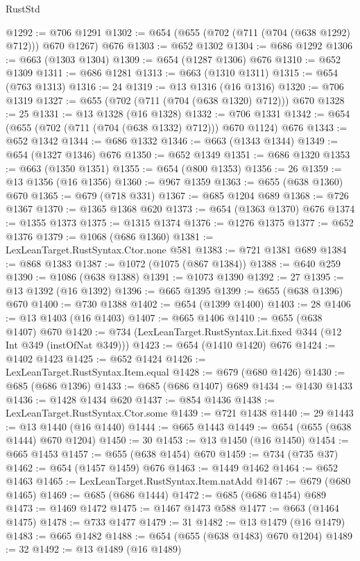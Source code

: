 \begin{lexlean}{RustStd}
\begin{coremodule}
@1292 := @706 @1291
@1302 := @654 (@655 (@702 (@711 (@704 (@638 @1292) @712))) @670 @1267) @676
@1303 := @652 @1302
@1304 := @686 @1292
@1306 := @663 (@1303 @1304)
@1309 := @654 (@1287 @1306) @676
@1310 := @652 @1309
@1311 := @686 @1281
@1313 := @663 (@1310 @1311)
@1315 := @654 (@763 @1313)
@1316 := 24
@1319 := @13 @1316 (@16 @1316)
@1320 := @706 @1319
@1327 := @655 (@702 (@711 (@704 (@638 @1320) @712))) @670
@1328 := 25
@1331 := @13 @1328 (@16 @1328)
@1332 := @706 @1331
@1342 := @654 (@655 (@702 (@711 (@704 (@638 @1332) @712))) @670 @1124) @676
@1343 := @652 @1342
@1344 := @686 @1332
@1346 := @663 (@1343 @1344)
@1349 := @654 (@1327 @1346) @676
@1350 := @652 @1349
@1351 := @686 @1320
@1353 := @663 (@1350 @1351)
@1355 := @654 (@800 @1353)
@1356 := 26
@1359 := @13 @1356 (@16 @1356)
@1360 := @967 @1359
@1363 := @655 (@638 @1360) @670
@1365 := @679 (@718 @331)
@1367 := @685 @1204 @689
@1368 := @726 @1367
@1370 := @1365 @1368 @620
@1373 := @654 (@1363 @1370) @676
@1374 := @1355 @1373
@1375 := @1315 @1374
@1376 := @1276 @1375
@1377 := @652 @1376
@1379 := @1068 (@686 @1360)
@1381 := LexLeanTarget.RustSyntax.Ctor.none @581
@1383 := @721 @1381 @689
@1384 := @868 @1383
@1387 := @1072 (@1075 (@867 @1384))
@1388 := @640 @259
@1390 := @1086 (@638 @1388)
@1391 := @1073 @1390
@1392 := 27
@1395 := @13 @1392 (@16 @1392)
@1396 := @665 @1395
@1399 := @655 (@638 @1396) @670
@1400 := @730 @1388
@1402 := @654 (@1399 @1400)
@1403 := 28
@1406 := @13 @1403 (@16 @1403)
@1407 := @665 @1406
@1410 := @655 (@638 @1407) @670
@1420 := @734 (LexLeanTarget.RustSyntax.Lit.fixed @344 (@12 Int @349 (instOfNat @349)))
@1423 := @654 (@1410 @1420) @676
@1424 := @1402 @1423
@1425 := @652 @1424
@1426 := LexLeanTarget.RustSyntax.Item.equal
@1428 := @679 (@680 @1426)
@1430 := @685 (@686 @1396)
@1433 := @685 (@686 @1407) @689
@1434 := @1430 @1433
@1436 := @1428 @1434 @620
@1437 := @854 @1436
@1438 := LexLeanTarget.RustSyntax.Ctor.some
@1439 := @721 @1438
@1440 := 29
@1443 := @13 @1440 (@16 @1440)
@1444 := @665 @1443
@1449 := @654 (@655 (@638 @1444) @670 @1204)
@1450 := 30
@1453 := @13 @1450 (@16 @1450)
@1454 := @665 @1453
@1457 := @655 (@638 @1454) @670
@1459 := @734 (@735 @37)
@1462 := @654 (@1457 @1459) @676
@1463 := @1449 @1462
@1464 := @652 @1463
@1465 := LexLeanTarget.RustSyntax.Item.natAdd
@1467 := @679 (@680 @1465)
@1469 := @685 (@686 @1444)
@1472 := @685 (@686 @1454) @689
@1473 := @1469 @1472
@1475 := @1467 @1473 @588
@1477 := @663 (@1464 @1475)
@1478 := @733 @1477
@1479 := 31
@1482 := @13 @1479 (@16 @1479)
@1483 := @665 @1482
@1488 := @654 (@655 (@638 @1483) @670 @1204)
@1489 := 32
@1492 := @13 @1489 (@16 @1489)

\end{coremodule}
\end{lexlean}
